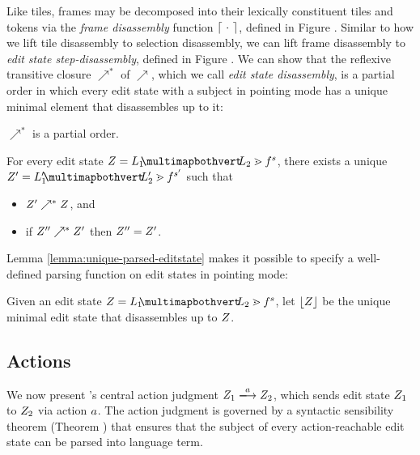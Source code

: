 Like tiles, frames may be decomposed into their
lexically constituent tiles and tokens via the
\emph{frame disassembly} function $\left\lceil~\cdot~\right\rceil$,
defined in Figure .
Similar to how we lift tile disassembly to selection
disassembly, we can lift frame disassembly to
\emph{edit state step-disassembly}, defined in Figure .
We can show that the reflexive transitive closure
$\nearrow^*$ of $\nearrow$, which we call \emph{edit state disassembly},
is a partial order in
which every edit state with a subject in pointing mode
has a unique minimal element that disassembles up to it:
\begin{lemma}
  $\nearrow^*$ is a partial order.
\end{lemma}
\begin{lemma}\label{lemma:unique-parsed-editstate}
  For every edit state $\editState = \zipper{\pointing{\selection_1}{\selection_2}}{\tfrelem^s}$,
  there exists a unique $\editState' = \zipper{\pointing{\selection'_1}{\selection'_2}}{\tfrelem^{s'}}$ such that
  \begin{itemize}
  \item $Z' \nearrow^* Z$, and
  \item if $Z'' \nearrow^* Z'$ then $Z'' = Z'$.
  \end{itemize}
\end{lemma}
Lemma \ref{lemma:unique-parsed-editstate} makes it
possible to specify a well-defined parsing function
on edit states in pointing mode:
\begin{definition}
  Given an edit state $\editState = \zipper{\pointing{\selection_1}{\selection_2}}{\tfrelem^s}$,
  let $\left\lfloor Z\right\rfloor$ be the unique minimal edit state
  that disassembles up to $Z$.
\end{definition}



\subsection{Actions} \label{sec:actions}
We now present \ty's central action judgment
$\performAction{\editState_1}{\action}{\editState_2}$,
which sends edit state $Z_1$ to $Z_2$
via action $a$.
The action judgment is governed by a syntactic sensibility
theorem (Theorem ) that ensures that
the subject of every action-reachable edit state can
be parsed into language term.

